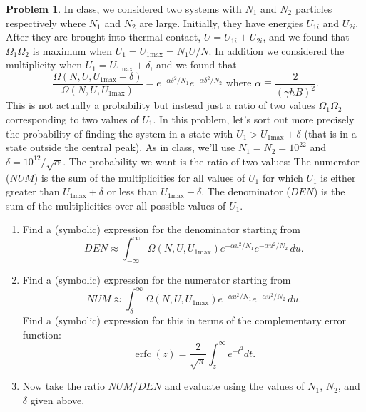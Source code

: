 \documentclass[10pt]{article}
\theoremstyle{definition}
\newtheorem{problem}{Problem}
\DeclareMathOperator{\erfc}{erfc}
\begin{document}
\begin{problem}
In class, we considered two systems with $N_1$ and $N_2$ particles respectively where $N_1$ and
$N_2$ are large. Initially, they have energies $U_{1i}$ and $U_{2i}$. After they are brought into thermal
contact, $U = U_{1i} + U_{2i}$, and we found that $\Omega_1\Omega_2$ is maximum when $U_1 = U_{1\text{max}} = N_1U/N$.
In addition we considered the multiplicity when $U_1 = U_{1\text{max}} + \delta$, and we found that
$$\frac{\Omega(N,U,U_{1\text{max}}+\delta)}{\Omega(N,U,U_{1\text{max}})}=e^{-\alpha\delta^2/N_1}e^{-\alpha\delta^2/N_2}\text{ where }\alpha\equiv \frac{2}{(\gamma\hbar B)^2}.$$
This is not actually a probability but instead just a ratio of two values $\Omega_1\Omega_2$ corresponding
to two values of $U_1$. In this problem, let's sort out more precisely the probability of finding
the system in a state with $U_1 > U_{1\text{max}} \pm δ$ (that is in a state outside the
central peak). As in class, we'll use $N_1 = N_2 = 10^{22}$ and $\delta=10^{12}/\sqrt{\alpha}$.
The probability we want is the ratio of two values:
The numerator ($NUM$) is the sum of the multiplicities for all values of $U_1$ for which $U_1$ is
either greater than $U_{1\text{max}}+\delta$ or less than $U_{1\text{max}}-\delta$.
The denominator ($DEN$) is the sum of the multiplicities over all possible values of $U_1$.
\begin{enumerate}[label=(\alph*)]
  \item Find a (symbolic) expression for the denominator starting from
        $$DEN\approx \int_{-\infty}^{\infty}\Omega(N,U,U_{1\text{max}})e^{-\alpha u^2/N_1}e^{-\alpha u^2/N_2}\,du.$$
  \item Find a (symbolic) expression for the numerator starting from
        $$NUM\approx \int_{\delta}^{\infty}\Omega(N,U,U_{1\text{max}})e^{-\alpha u^2/N_1}e^{-\alpha u^2/N_2}\,du.$$
        Find a (symbolic) expression for this in terms of the complementary error function:
        $$\erfc(z)=\frac{2}{\sqrt{\pi}}\int_{z}^{\infty}e^{-t^2}dt.$$
  \item Now take the ratio $NUM/DEN$ and evaluate using the values of $N_1$, $N_2$, and $\delta$ given
        above.
\end{enumerate}
\end{problem}
\end{document}
